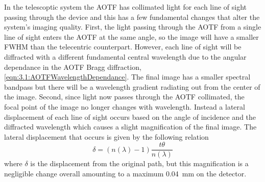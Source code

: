 \documentclass[12pt]{article}
\begin{document}

In the telescoptic system the AOTF has collimated light for each line of sight passing through the device and this has a few fundamental changes that alter the system's imaging quality. First, the light passing through the AOTF from a single line of sight enters the AOTF at the same angle, so the image will have a smaller FWHM than the telecentric counterpart. However, each line of sight will be diffracted with a different fundamental central wavelength due to the angular dependance in the AOTF Bragg diffraction, \autoref{eqn:3.1:AOTFWavelengthDependance}. The final image has a smaller spectral bandpass but there will be a wavelength gradient radiating out from the center of the image. Second, since light now passes through the AOTF collimated, the focal point of the image no longer changes with wavelength. Instead a lateral displacement of each line of sight occurs based on the angle of incidence and the diffracted wavelength which causes a slight magnification of the final image. The lateral displacement that occurs is given by the following relation
\begin{equation}
    \delta = (n(\lambda)-1)\frac{t\theta}{n(\lambda)}
    \label{eqn:3.2:planeParallelDiplacement}
\end{equation}
where $\delta$ is the displacement from the original path, but this magnification is a negligible change overall amounting to a maximum 0.04~mm on the detector.

\end{document}
